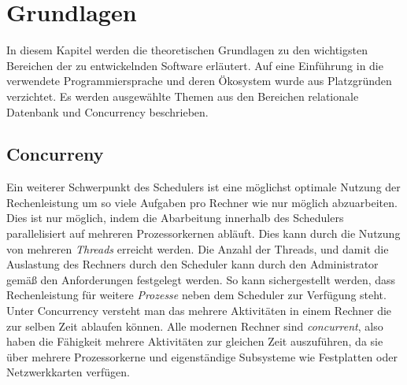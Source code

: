 \chapter{Grundlagen}\label{chap:Grundlagen}
\chapterstart
In diesem Kapitel werden die theoretischen Grundlagen zu den wichtigsten Bereichen der zu entwickelnden Software erläutert. Auf eine Einführung in die verwendete Programmiersprache und deren Ökosystem wurde aus Platzgründen verzichtet. Es werden ausgewählte Themen aus den Bereichen relationale Datenbank und Concurrency beschrieben.

\section{Concurreny}
Ein weiterer Schwerpunkt des Schedulers ist eine möglichst optimale Nutzung der Rechenleistung um so viele Aufgaben pro Rechner wie nur möglich abzuarbeiten. Dies ist nur möglich, indem die Abarbeitung innerhalb des Schedulers parallelisiert auf mehreren Prozessorkernen abläuft. Dies kann durch die Nutzung von mehreren \emph{Threads} erreicht werden. Die Anzahl der Threads, und damit die Auslastung des Rechners durch den Scheduler kann durch den Administrator gemäß den Anforderungen festgelegt werden. So kann sichergestellt werden, dass Rechenleistung für weitere \emph{Prozesse} neben dem Scheduler zur Verfügung steht.
\\Unter Concurrency versteht man das mehrere Aktivitäten in einem Rechner die zur selben Zeit ablaufen können. Alle modernen Rechner sind \emph{concurrent}, also haben die Fähigkeit mehrere Aktivitäten zur gleichen Zeit auszuführen, da sie über mehrere Prozessorkerne und eigenständige Subsysteme wie Festplatten oder Netzwerkkarten verfügen.\cite{Anderson2014}
